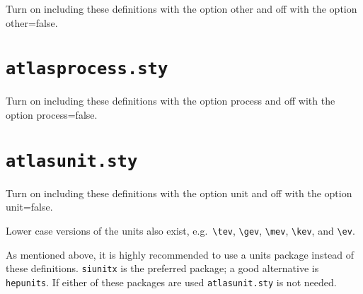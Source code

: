 \documentclass[UKenglish,texlive=2013]{\ATLASLATEXPATH atlasdoc}
\newcommand{\File}[1]{\texttt{#1}\xspace}
\newcommand{\Option}[1]{\textsf{#1}\xspace}
\newcommand{\Package}[1]{\texttt{#1}\xspace}
\begin{document}
{Turn on including these definitions with the option \Option{other} and off with the option \Option{other=false}.




\newpage
\section{\File{atlasprocess.sty}}

Turn on including these definitions with the option \Option{process} and off with the option \Option{process=false}.




\newpage
\section{\File{atlasunit.sty}}

Turn on including these definitions with the option \Option{unit} and off with the option \Option{unit=false}.



\noindent Lower case versions of the units also exist, e.g.\ \verb|\tev|, \verb|\gev|, \verb|\mev|, \verb|\kev|, and
\verb|\ev|. 

As mentioned above, it is highly recommended to use a units package instead of
these definitions. \Package{siunitx} is the preferred package; a good alternative is \Package{hepunits}.
If either of these packages are used \File{atlasunit.sty} is not needed.

}
\end{document}
